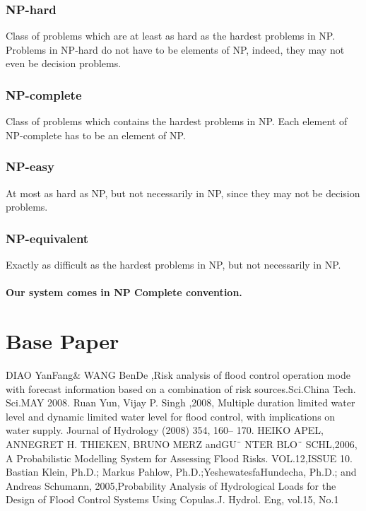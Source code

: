 \documentclass[a4paper,12pt]{report}
\begin{document}
\begin{itemize}
	
\subsection { NP-hard}
Class of problems which are at least as hard as the hardest problems in NP. Problems in NP-hard do not have to be elements of NP, indeed, they may not even be decision problems.


\subsection {NP-complete} 
\par 
Class of problems which contains the hardest problems in NP. Each element of NP-complete has to be an element of NP.
\subsection {NP-easy} 
\par 
At most as hard as NP, but not necessarily in NP, since they may not be decision problems.

\subsection {NP-equivalent} 
\par 
Exactly as difficult as the hardest problems in NP, but not necessarily in NP.\\\\

\textbf{ Our system comes in NP Complete  convention.}

\chapter{Base Paper}




\begin{thebibliography}{SJL05}
\bibitem{} DIAO YanFang& WANG BenDe ,Risk analysis of flood control operation mode with forecast information based on a combination of risk sources.Sci.China Tech. Sci.MAY 2008.
\bibitem{}Ruan Yun, Vijay P. Singh ,2008, Multiple duration limited water level and dynamic limited water level for flood control, with implications on
water supply. Journal of Hydrology (2008) 354, 160– 170.
\bibitem{} HEIKO APEL, ANNEGRET H. THIEKEN, BRUNO MERZ andGU¨ NTER BLO¨ SCHL,2006, A Probabilistic Modelling System for
Assessing Flood Risks. VOL.12,ISSUE 10.
\bibitem{} Bastian Klein, Ph.D.; Markus Pahlow, Ph.D.;YeshewatesfaHundecha, Ph.D.; and Andreas Schumann, 2005,Probability Analysis of Hydrological
Loads for the Design of Flood Control Systems Using Copulas.J. Hydrol. Eng, vol.15, No.1
 

\end{thebibliography}
\end{itemize}
\end{document}

